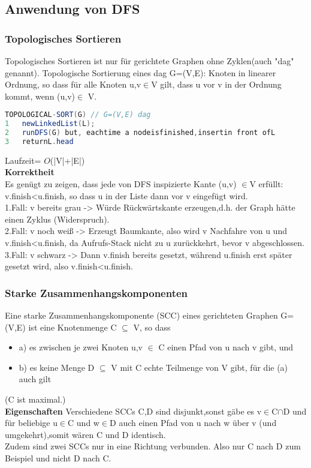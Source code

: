 \documentclass[jou,apacite]{apa6}
\begin{document}
\subsection{Anwendung von DFS}
\subsubsection{Topologisches Sortieren}
Topologisches Sortieren ist nur für gerichtete Graphen ohne Zyklen(auch "dag" genannt). Topologische Sortierung eines dag G=(V,E): Knoten in linearer Ordnung, so dass für alle Knoten u,v$\in$V gilt, dass u vor v in der Ordnung kommt, wenn (u,v)$\in$ V.
\begin{lstlisting}[language=java]
TOPOLOGICAL-SORT(G) // G=(V,E) dag
1   newLinkedList(L);
2   runDFS(G) but, eachtime a nodeisfinished,insertin front ofL 
3   returnL.head
\end{lstlisting}
Laufzeit= $O$(|V|+|E|)\\
{\bfseries Korrektheit }\\ 
Es genügt zu zeigen, dass jede von DFS inspizierte Kante (u,v) $\in$V erfüllt: v.finish<u.finish, so dass u in der Liste dann vor v eingefügt wird.\\
1.Fall: v bereits grau -> Würde Rückwärtskante erzeugen,d.h. der Graph hätte einen Zyklus (Widerspruch). \\
2.Fall: v noch weiß -> Erzeugt Baumkante, also wird v Nachfahre von u und v.finish<u.finish, da Aufrufs-Stack nicht zu u zurückkehrt, bevor v abgeschlossen. \\
3.Fall: v schwarz -> Dann v.finish bereits gesetzt, während u.finish erst später gesetzt wird, also v.finish<u.finish.\\

\subsubsection{Starke Zusammenhangskomponenten}
Eine starke Zusammenhangskomponente (SCC) eines gerichteten Graphen G=(V,E) ist eine Knotenmenge C $\subseteq$ V, 
so dass\\
\begin{itemize}
    \item a) es zwischen je zwei Knoten u,v $\in$ C einen Pfad von u nach v gibt, und 
    \item b) es keine Menge D $\subseteq$ V mit C echte Teilmenge von V gibt, für die (a) auch gilt
\end{itemize}
(C ist maximal.)\\
{\bfseries Eigenschaften}
Verschiedene SCCs C,D sind disjunkt,sonst gäbe es  v$\in$C$\cap$D und für beliebige  u$\in$C und  w$\in$D auch einen Pfad von u nach w über v (und umgekehrt),somit wären C und D identisch.\\
Zudem sind zwei SCCs nur in eine Richtung verbunden. Also nur C nach D zum Beispiel und nicht D nach C.\\
\end{document}
